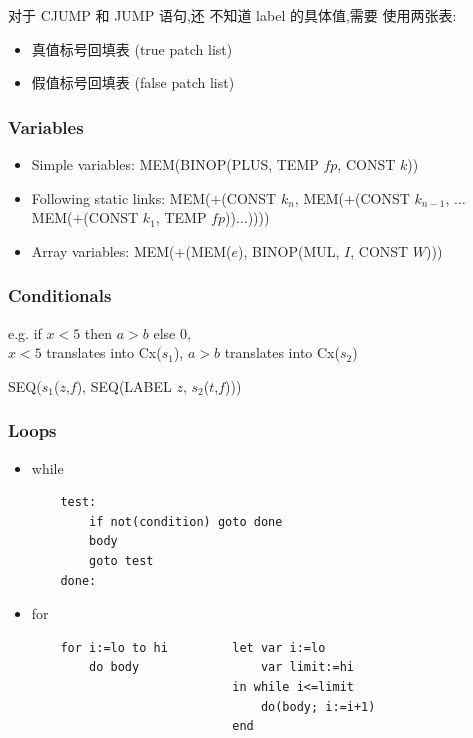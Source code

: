 对于 CJUMP 和 JUMP 语句,还 不知道 label 的具体值,需要 使用两张表: 
\begin{itemize}
    \item 真值标号回填表 (true patch list)
    \item 假值标号回填表 (false patch list)
\end{itemize}

\subsubsection{Variables}
\begin{itemize}
    \item Simple variables: 
    \subitem MEM(BINOP(PLUS, TEMP $fp$, CONST $k$))
    \item Following static links:
    \subitem MEM(+(CONST $k_n$, MEM(+(CONST $k_{n-1}$, $\dots$ MEM(+(CONST $k_1$, TEMP $fp$))$\dots$))))
    \item Array variables: 
    \subitem MEM(+(MEM($e$), BINOP(MUL, $I$, CONST $W$)))
\end{itemize}

\subsubsection{Conditionals}
e.g. if $x<5$ then $a>b$ else 0, \\
$x<5$ translates into Cx($s_1$), $a>b$ translates into Cx($s_2$)

SEQ($s_1$($z$,$f$), SEQ(LABEL $z$, $s_2$($t$,$f$)))

\subsubsection{Loops}
\begin{itemize}
    \item while
    \begin{verbatim}
    test:
        if not(condition) goto done
        body
        goto test
    done:
    \end{verbatim}
    
    \item for
    \begin{verbatim}
    for i:=lo to hi         let var i:=lo
        do body                 var limit:=hi
                            in while i<=limit
                                do(body; i:=i+1)
                            end
    \end{verbatim}
    
\end{itemize}

